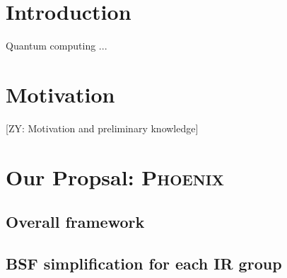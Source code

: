 \documentclass[conference]{IEEEtran}
\newcommand{\ZY}[1]{{\color{purple}[ZY: #1]}}
\newcommand{\phoenix}{\textsc{Phoenix}}
\begin{document}

\section{Introduction}

    Quantum computing ...
    







\section{Motivation}

\ZY{Motivation and preliminary knowledge}


\section{Our Propsal: \phoenix}

\subsection{Overall framework}

\subsection{BSF simplification for each IR group}
\end{document}
